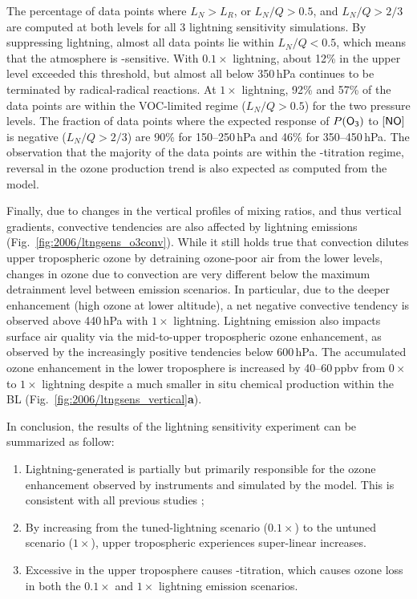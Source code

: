 The percentage of data points where $L_N>L_R$, or $L_N/Q > 0.5$, and $L_N/Q>2/3$ are computed at both
levels for all 3 lightning sensitivity simulations. By suppressing lightning, almost all data points lie within $L_N/Q<0.5$,
which means that the atmosphere is -sensitive. With $0.1\times$
lightning, about 12\% in the upper level exceeded this threshold, but almost all  below 350\,\unit{hPa}
continues to be terminated by radical-radical reactions. At $1\times$ lightning, 92\% and 57\% of the data
points are within the VOC-limited regime ($L_N/Q>0.5$) for the two pressure levels. The fraction of data points
where the expected response of $P(\chem{O_3})$ to $[\chem{NO}]$ is negative ($L_N/Q>2/3$) are 90\% for
150--250\,\unit{hPa} and 46\% for 350--450\,\unit{hPa}. The observation that the majority of the data points
are within the -titration regime, reversal in the ozone production trend is also expected as computed
from the model.

Finally, due to changes in the vertical profiles of mixing ratios, and thus vertical gradients, convective tendencies are also affected by
lightning emissions (Fig.~\ref{fig:2006/ltngsens_o3conv}). While it still holds true that convection dilutes upper
tropospheric ozone by detraining ozone-poor air from the lower levels, changes in ozone due to convection
are very different below the maximum detrainment level between emission scenarios. In particular, due to the deeper enhancement (high
ozone at lower altitude), a net negative convective tendency is observed above 440\,\unit{hPa} with $1\times$ lightning.
Lightning emission also impacts surface air quality via the mid-to-upper tropospheric ozone enhancement, as observed
by the increasingly positive tendencies below 600\,\unit{hPa}. The accumulated ozone enhancement in the lower
troposphere is increased by 40--60\,\unit{ppbv} from $0\times$ to $1\times$ lightning despite a much smaller in situ
chemical production within the BL (Fig.~\ref{fig:2006/ltngsens_vertical}{\bf a}).

In conclusion, the results of the lightning sensitivity experiment can be summarized as follow:
\begin{enumerate}
\item Lightning-generated  is partially but primarily responsible for the ozone enhancement observed by
instruments and simulated by the model. This is consistent with all previous studies \citep[e.g.][]{Li:2005ss,Cooper:2007cr,Barth:2012qf};
\item By increasing from the tuned-lightning scenario ($0.1\times$) to the untuned scenario ($1\times$), upper tropospheric
 experiences super-linear increases.
\item Excessive  in the upper troposphere causes -titration, which causes ozone loss in both
the $0.1\times$ and $1\times$ lightning emission scenarios.
\end{enumerate}

